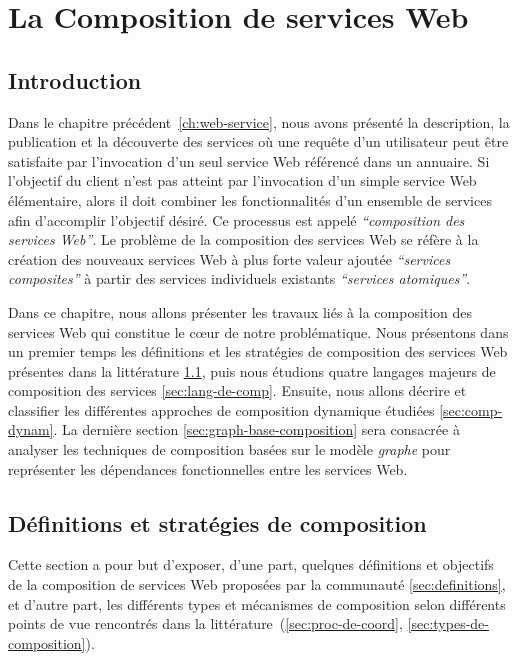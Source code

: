 \chapter{La Composition de services Web}
\label{ch:composition}

\section*{Introduction}
 

Dans le chapitre précédent~\ref{ch:web-service}, nous avons présenté
la description, la publication et la découverte des services où une
requête d'un utilisateur peut être satisfaite par l'invocation d'un
seul service Web référencé dans un annuaire. Si l'objectif du client
n'est pas atteint par l'invocation d'un simple service Web
élémentaire, alors il doit combiner les fonctionnalités d'un ensemble
de services afin d'accomplir l'objectif désiré. Ce processus est
appelé \textit{``composition des services Web''}. Le problème de la
composition des services Web se réfère à la création des nouveaux
services Web à plus forte valeur ajoutée \textit{``services
  composites''} à partir des services individuels existants
\textit{``services atomiques''}.\bigskip

Dans ce chapitre, nous allons présenter les travaux liés à la
composition des services Web qui constitue le cœur de notre
problématique. Nous présentons dans un premier temps les définitions
et les stratégies de composition des services Web présentes dans la
littérature \ref{sec:defs}, puis nous étudions quatre langages majeurs
de composition des services \ref{sec:lang-de-comp}. Ensuite, nous
allons décrire et classifier les différentes approches de composition
dynamique étudiées \ref{sec:comp-dynam}. La dernière section
\ref{sec:graph-base-composition} sera consacrée à analyser les
techniques de composition basées sur le modèle \textit{graphe} pour
représenter les dépendances fonctionnelles entre les services Web.

\newpage
\section{Définitions et stratégies de composition}
\label{sec:defs}
Cette section a pour but d'exposer, d'une part, quelques définitions
et objectifs de la composition de services Web proposées par la
communauté \ref{sec:definitions}, et d'autre part, les différents
types et mécanismes de composition selon différents points de vue
rencontrés dans la littérature~(\ref{sec:proc-de-coord},
\ref{sec:types-de-composition}).

